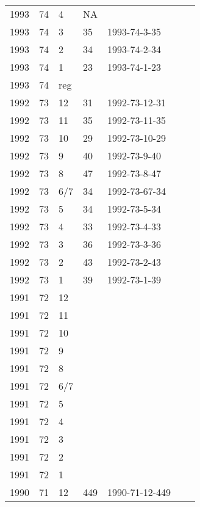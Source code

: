 \begin{longtable}{ |l|l|l|l|p{2.7cm}|l|p{2cm}| }
 1993 & 74 &     4 &  NA     &                &  & \\
 1993 & 74 &     3 &  35     & 1993-74-3-35   &  & \\
 1993 & 74 &     2 &     34  & 1993-74-2-34   &  & \\
 1993 & 74 &     1 &  23     & 1993-74-1-23   &  & \\
 1993 & 74 &   reg &         &                &  & \\
 1992 & 73 &    12 &     31  & 1992-73-12-31  &  & \\
 1992 & 73 &    11 &   35    & 1992-73-11-35  &  & \\
 1992 & 73 &    10 &   29    & 1992-73-10-29  &  & \\
 1992 & 73 &     9 &   40    & 1992-73-9-40   &  & \\
 1992 & 73 &     8 &    47   & 1992-73-8-47   &  & \\
 1992 & 73 &   6/7 &    34   &  1992-73-67-34 &  & \\
 1992 & 73 &     5 &      34 &  1992-73-5-34  &  & \\
 1992 & 73 &     4 &     33  &  1992-73-4-33  &  & \\
 1992 & 73 &     3 &    36   &  1992-73-3-36  &  & \\
 1992 & 73 &     2 &    43   & 1992-73-2-43   &  & \\
 1992 & 73 &     1 &     39  & 1992-73-1-39   &  & \\
 1991 & 72 &    12 &         &                &  & \\
 1991 & 72 &    11 &         &                &  & \\
 1991 & 72 &    10 &         &                &  & \\
 1991 & 72 &     9 &         &                &  & \\
 1991 & 72 &     8 &         &                &  & \\
 1991 & 72 &   6/7 &         &                &  & \\
 1991 & 72 &     5 &         &                &  & \\
 1991 & 72 &     4 &         &                &  & \\
 1991 & 72 &     3 &         &                &  & \\
 1991 & 72 &     2 &         &                &  & \\
 1991 & 72 &     1 &         &                &  & \\
 1990 & 71 &    12 &   449   & 1990-71-12-449 &  & \\

\end{longtable}
